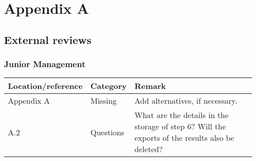 \section{Appendix A}
\subsection{External reviews}
\subsubsection*{Junior Management}
\begin{longtable}{l|l|p{}}
Location/reference & Category & Remark\\
\hline
\hline
\endhead
\hline
\endfoot
Appendix A & Missing & Add alternatives, if necessary. \\
A.2 & Questions & What are the details in the storage of step 6? Will the exports of the results also be deleted? \\
\end{longtable}

